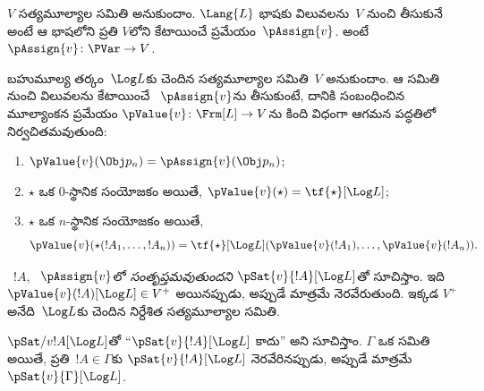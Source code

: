 \documentclass[../../../include/open-logic-section]{subfiles}
\begin{document}


\begin{defn}
$V$ సత్యమూల్యాల సమితి అనుకుందాం. $\Lang{L}$ భాషకు
విలువలను~$V$ నుంచి తీసుకునే \emph{}
అంటే ఆ భాషలోని ప్రతి 
$V$లోని  కేటాయించే ప్రమేయం~$\pAssign{v}$.
అంటే $\pAssign{v} \colon
\PVar \to V$.
\end{defn}

\begin{defn}
  బహుమూల్య తర్కం~$\Log L$కు చెందిన సత్యమూల్యాల సమితి~$V$ అనుకుందాం.
  ఆ సమితి నుంచి విలువలను కేటాయించే ~$\pAssign{v}$ను
  తీసుకుంటే, దానికి సంబంధించిన మూల్యాంకన ప్రమేయం
  $\pValue{v} \colon \Frm[L] \to V$ను కింది విధంగా
  ఆగమన పద్ధతిలో నిర్వచితమవుతుంది:
  \begin{enumerate}
    \item $\pValue{v}(\Obj p_n) = \pAssign{v}(\Obj p_n)$;
    \item $\star$ ఒక $0$-స్థానిక సంయోజకం అయితే,
    $\pValue{v}(\star)  = \tf{\star}[\Log L]$;
    \item $\star$ ఒక $n$-స్థానిక సంయోజకం అయితే,
    \[
      \pValue{v}(\star(!A_1, \dots, !A_n)) = \tf{\star}[\Log L]
      (\pValue{v}(!A_1), \dots, \pValue{v}(!A_n)).
    \]
  \end{enumerate}
\end{defn}

\begin{defn}[సంతృప్తి]
 ~$!A$,
  ~$\pAssign{v}$లో
  \emph{సంతృప్తమవుతుందని} $\pSat{v}{!A}[\Log L]$తో సూచిస్తాం.
  ఇది $\pValue{v}(!A)[\Log L] \in V^+$ అయినప్పుడు, అప్పుడే మాత్రమే నెరవేరుతుంది.
  ఇక్కడ $V^+$ అనేది~$\Log L$కు చెందిన నిర్దేశిత సత్యమూల్యాల సమితి.

  $\pSat/{v}{!A}[\Log L]$తో ``$\pSat{v}{!A}[\Log
  L]$ కాదు'' అని సూచిస్తాం. $\Gamma$ ఒక
   సమితి అయితే, ప్రతి~$!A \in \Gamma$కు
  $\pSat{v}{!A}[\Log L]$ నెరవేరినప్పుడు, అప్పుడే మాత్రమే
  $\pSat{v}{\Gamma}[\Log L]$.
\end{defn}
\end{document}
